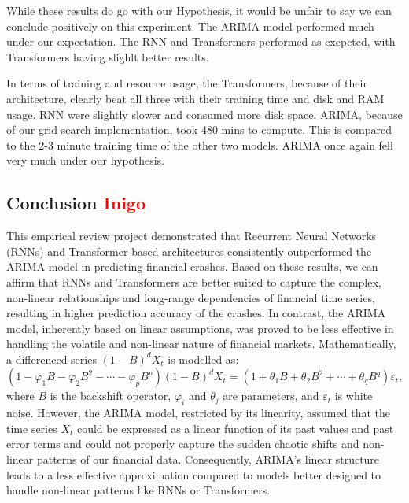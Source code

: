 \documentclass[12pt, letterpaper]{article}
\begin{document}
While these results do go with our Hypothesis, it would be unfair to say we can conclude positively on this experiment. The ARIMA model performed much under our expectation. The RNN and Transformers performed as exepcted, with Transformers having slighlt better results.

In terms of training and resource usage, the Transformers, because of their architecture, clearly beat all three with their training time and disk and RAM usage. RNN were slightly slower and consumed more disk space. ARIMA, because of our grid-search implementation, took 480 mins to compute. This is compared to the 2-3 minute training time of the other two models. ARIMA once again fell very much under our hypothesis.

\subsection*{Conclusion \textcolor{red}{Inigo}}
This empirical review project demonstrated that Recurrent Neural Networks (RNNs) and Transformer-based architectures consistently outperformed the ARIMA model in predicting financial crashes. Based on these results, we can affirm that RNNs and Transformers are better suited to capture the complex, non-linear relationships and long-range dependencies of financial time series, resulting in higher prediction accuracy of the crashes. In contrast, the ARIMA model, inherently based on linear assumptions, was  proved to be less effective in handling the volatile and non-linear nature of financial markets. Mathematically, a differenced series \((1-B)^d X_t\) is modelled as: \[ (1 - \varphi_1 B - \varphi_2 B^2 - \cdots - \varphi_p B^p)(1-B)^d X_t = (1 + \theta_1 B + \theta_2 B^2 + \cdots + \theta_q B^q)\varepsilon_t, \] where \(B\) is the backshift operator, \(\varphi_i\) and \(\theta_j\) are parameters, and \(\varepsilon_t\) is white noise. However, the ARIMA model, restricted by its linearity, assumed that the time series $X_t$ could be expressed as a linear function of its past values and past error terms and could not properly capture the sudden chaotic shifts and non-linear patterns of our financial data. Consequently, ARIMA’s linear structure leads to a less effective approximation compared to models better designed to handle non-linear patterns like RNNs or Transformers.
\end{document}

